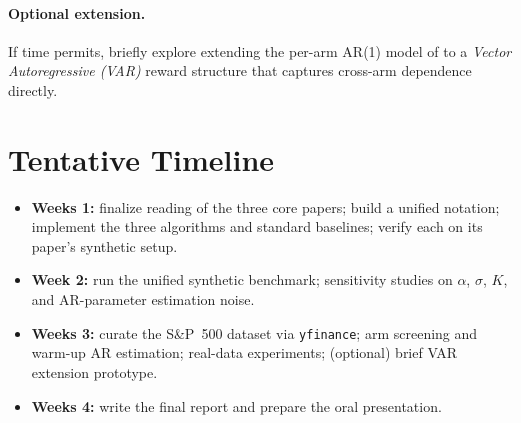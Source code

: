 \documentclass[11pt]{article}
\begin{document}
\paragraph{Optional extension.} If time permits, briefly explore extending the per-arm AR(1) model of \citet{chen2023ar2} to a \emph{Vector Autoregressive (VAR)} reward structure that captures cross-arm dependence directly.

\section{Tentative Timeline}

\begin{itemize}
  \item \textbf{Weeks 1:} finalize reading of the three core papers; build a unified notation; implement the three algorithms and standard baselines; verify each on its paper's synthetic setup.
  \item \textbf{Week 2:} run the unified synthetic benchmark; sensitivity studies on $\alpha$, $\sigma$, $K$, and AR-parameter estimation noise.
  \item \textbf{Weeks 3:} curate the S\&P~500 dataset via \texttt{yfinance}; arm screening and warm-up AR estimation; real-data experiments; (optional) brief VAR extension prototype.
  \item \textbf{Weeks 4:} write the final report and prepare the oral presentation.
\end{itemize}

\newpage


\end{document}
